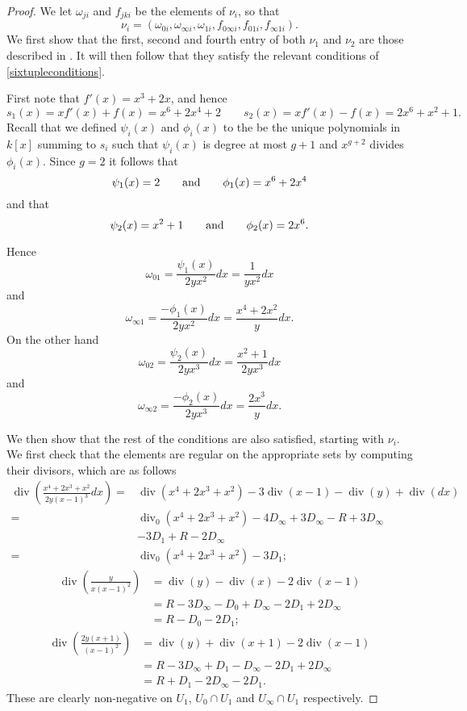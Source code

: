 \documentclass[draft, 11pt]{article} %
\theoremstyle{plain}
\theoremstyle{remark}
\DeclareMathOperator{\di}{div}
\begin{document}
\begin{proof}
We let $\omega_{ji}$ and $f_{jki}$ be the elements of $\nu_i$, so that
\[
\nu_i = (\omega_{0i}, \omega_{\infty i}, \omega_{1i}, f_{0\infty i}, f_{01i}, f_{\infty 1 i} ).
\]
We first show that the first, second and fourth entry of both $\nu_1$ and $\nu_2$ are those described in \cite[Thm. 2.2]{derhamactions}.
It will then follow that they satisfy the relevant conditions of \eqref{sixtupleconditions}.

First note that $f'(x) = x^3 + 2x$, and hence
\[
s_1(x) = xf'(x) + f(x) = x^6 + 2x^4 + 2 \qquad s_2(x) = xf'(x) - f(x) = 2x^6 + x^2 +1.
\]
Recall that we defined $\psi_i(x)$ and $\phi_i(x)$ to the be the unique polynomials in $k[x]$ summing to $s_i$ such that $\psi_i(x)$ is degree at most $g+1$ and $x^{g+2}$ divides $\phi_i(x)$.
Since $g=2$ it follows that
\[
\psi_1(x) = 2 \qquad {\rm and}\qquad \phi_1(x) = x^6 + 2x^4
\]
and that
\[
\psi_2(x) = x^2 +1 \qquad {\rm and} \qquad \phi_2(x) = 2x^6.
\]

Hence
\[
\omega_{01} = \frac{\psi_1(x)}{2yx^2}dx = \frac{1}{yx^2}dx
\]
and
\[
\omega_{\infty 1} = \frac{-\phi_1(x)}{2yx^2}dx = \frac{x^4+2x^2}{y}dx.
\]
On the other hand
\[
\omega_{02} = \frac{\psi_2(x)}{2yx^3}dx = \frac{x^2+1}{2yx^3}dx
\]
and
\[
\omega_{\infty 2} = \frac{-\phi_2(x)}{2yx^3}dx = \frac{2x^3}{y}dx.
\]

We then show that the rest of the conditions are also satisfied, starting with $\nu_i$.
We first check that the elements are regular on the appropriate sets by computing their divisors, which are as follows
\begin{align*}
\di \left( \frac{x^4 + 2x^3 + x^2}{2y(x-1)^3}dx \right)  = & \di(x^4 + 2x^3 + x^2) -3\di(x-1) - \di(y) + \di(dx) \\
= &\di_0(x^4 + 2x^3 + x^2) - 4D_\infty + 3D_\infty  - R +3D_\infty\\
&  -3D_1 +R - 2D_\infty \\
= & \di_0(x^4 + 2x^3 + x^2) - 3D_1;
\end{align*}
\begin{align*}
\di \left(\frac{y}{x(x-1)^2} \right) & = \di(y) - \di(x) - 2\di(x-1) \\
& = R - 3D_\infty - D_0 + D_\infty - 2D_1 + 2D_\infty \\
& = R - D_0 - 2D_1;
\end{align*}
\begin{align*}
\di \left( \frac{2y(x+1)}{(x-1)^2} \right) & = \di(y) + \di(x+1) - 2\di(x-1) \\
& = R - 3D_\infty +D_1 - D_\infty - 2D_1 + 2D_\infty \\
& = R + D_1 - 2D_\infty - 2D_1.
\end{align*}
These are clearly non-negative on $U_1$, $U_0 \cap U_1$ and $U_\infty \cap U_1$ respectively.


\end{proof}
\end{document}

